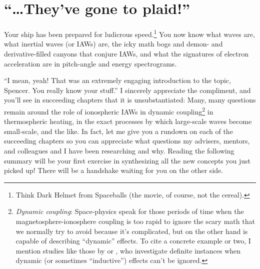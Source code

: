 







\section{``\dots They've gone to plaid!''}

Your ship has been prepared for ludicrous speed.\footnote{Think Dark Helmet from
  Spaceballs (the movie, of course, not the cereal).} You now know what \Alf
waves are, what inertial \Alf waves (or IAWs) are, the icky math bogs and demon-
and derivative-filled canyons that conjure IAWs, and what the signatures of
\Alfic electron acceleration are in pitch-angle and energy spectrograms.

``I mean, yeah! That was an extremely engaging introduction to the topic,
Spencer. You really know your stuff.'' I sincerely appreciate the compliment,
and you'll see in succeeding chapters that it is unsubstantiated: Many, many
questions remain around the role of ionospheric IAWs in dynamic
coupling\footnote{\textit{Dynamic coupling}: Space-physics speak for those
  periods of time when the magnetosphere-ionosphere coupling is too rapid to
  ignore the scary math that we normally try to avoid because it's complicated,
  but on the other hand is capable of describing ``dynamic'' effects. To cite a
  concrete example or two, I mention studies like those by \citet{Mishin2015} or
  \citet{Verkhoglyadova2016}, who investigate definite instances when dynamic
  (or sometimes ``inductive'') effects can't be ignored.} in thermospheric
heating, in the exact processes by which large-scale waves become small-scale,
and the like. In fact, let me give you a rundown on each of the succeeding
chapters so you can appreciate what questions my advisers, mentors, and
colleagues and I have been researching and why. Reading the following summary
will be your first exercise in synthesizing all the new concepts you just picked
up! There will be a handshake waiting for you on the other side.

